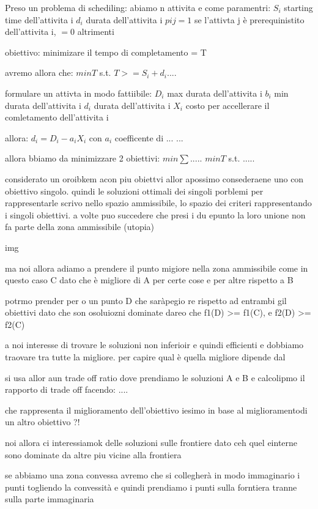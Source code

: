 Preso un problema di schediling:
abiamo n attivita e come paramentri:
$S_i$ starting time dell'attivita i
$d_i$ durata dell'attivita i
$pij = 1$ se l'attivta j è prerequinistito dell'attivita i, $=0$ altrimenti

obiettivo: minimizare il tempo di completamento = T


avremo allora che:
$min T$
s.t.
$T >= S_i + d_i ....$



formulare un attivta in modo fattiibile:
$D_i$ max durata dell'attivita i
$b_i$ min durata dell'attivita i
$d_i$ durata dell'attivita i
$X_i$ costo per accellerare il comletamento dell'attivita i

allora:
$d_i = D_i-a_iX_i$ con $a_i$ coefficente di ...
...

allora bbiamo da minimizzare 2 obiettivi:
$min \sum .....$
$min T$
s.t.
.....


considerato un oroibkem acon piu obiettvi allor apossimo consederaene uno con obiettivo singolo. quindi le soluzioni ottimali dei singoli porblemi per rappresentarle scrivo nello spazio ammissibile, lo spazio dei criteri rappresentando i singoli obiettivi. a volte puo succedere che presi i du epunto la loro unione non fa parte della zona ammissibile (utopia)

img

ma noi allora adiamo a prendere il punto migiore nella zona ammissibile come in questo caso C dato che è migliore di A per certe cose e per altre rispetto a B

potrmo prender per o un punto D che saràpegio re rispetto ad entrambi gil obiettivi dato che son osoluiozni dominate dareo che f1(D) >= f1(C), e f2(D) >= f2(C)

a noi interesse di trovare le soluzioni non inferioir e quindi efficienti e dobbiamo traovare tra tutte la migliore. per capire qual è quella migliore dipende dal 


si usa allor aun trade off ratio dove prendiamo le soluzioni A e B e calcolipmo il rapporto di trade off facendo:
....

che rappresenta il miglioramento dell'obiettivo iesimo in base al miglioramentodi un altro obiettivo ?!

noi allora ci interessiamok delle soluzioni sulle frontiere dato ceh quel einterne sono dominate da altre piu vicine alla frontiera

se abbiamo una zona convessa avremo che si collegherà in modo immaginario i punti togliendo la convessità e quindi prendiamo i punti sulla forntiera tranne sulla parte immaginaria


